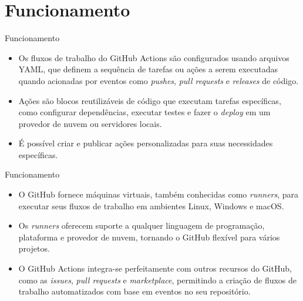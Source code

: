 \documentclass[t,serif]{beamer}
\begin{document}
\section{Funcionamento}
	\begin{frame}{Funcionamento}
		\vspace{0.5cm}
		\begin{itemize}
			\item Os fluxos de trabalho do GitHub Actions são configurados usando arquivos YAML, que definem a sequência de tarefas ou ações a serem executadas quando acionadas por eventos como \textit{pushes}, \textit{pull requests} e \textit{releases} de código.
			\vspace{0.5cm}
			\item Ações são blocos reutilizáveis de código que executam tarefas específicas, como configurar dependências, executar testes e fazer o \textit{deploy} em um provedor de nuvem ou servidores locais.
			\vspace{0.5cm}
			\item É possível criar e publicar ações personalizadas para suas necessidades específicas.
		\end{itemize}
	\end{frame}
	
	\begin{frame}{Funcionamento}
		\vspace{0.5cm}
		\begin{itemize}
			\item O GitHub fornece máquinas virtuais, também conhecidas como \textit{runners}, para executar seus fluxos de trabalho em ambientes Linux, Windows e macOS.
			\vspace{0.5cm}
			\item Os \textit{runners} oferecem suporte a qualquer linguagem de programação, plataforma e provedor de nuvem, tornando o GitHub flexível para vários projetos.
			\vspace{0.5cm}
			\item O GitHub Actions integra-se perfeitamente com outros recursos do GitHub, como as \textit{issues}, \textit{pull requests} e \textit{marketplace}, permitindo a criação de fluxos de trabalho automatizados com base em eventos no seu repositório.
		\end{itemize}
	\end{frame}
	
\end{document}
